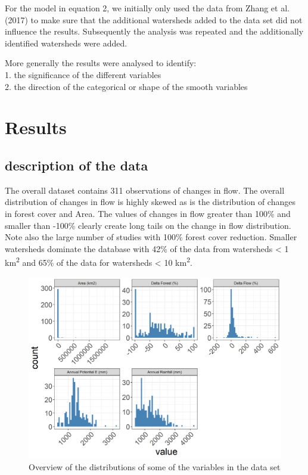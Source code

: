 \documentclass[]{elsarticle} %
\begin{document}
For the model in equation 2, we initially only used the data from Zhang
et al. (2017) to make sure that the additional watersheds added to the
data set did not influence the results. Subsequently the analysis was
repeated and the additionally identified watersheds were added.

More generally the results were analysed to identify:\\
1. the significance of the different variables\\
2. the direction of the categorical or shape of the smooth variables

\hypertarget{results}{%
\section{Results}\label{results}}

\hypertarget{description-of-the-data}{%
\subsection{description of the data}\label{description-of-the-data}}

The overall dataset contains 311 observations of changes in flow. The
overall distribution of changes in flow is highly skewed as is the
distribution of changes in forest cover and Area. The values of changes
in flow greater than 100\% and smaller than -100\% clearly create long
tails on the change in flow distribution. Note also the large number of
studies with 100\% forest cover reduction. Smaller watersheds dominate
the database with 42\% of the data from watersheds \textless{} 1
km\textsuperscript{2} and 65\% of the data for watersheds \textless{} 10
km\textsuperscript{2}.

\begin{figure}
\includegraphics[width=0.9\linewidth]{DataExploration} \caption{Overview of the distributions of some of the variables in the data set}\label{fig:data_graphs}
\end{figure}
\end{document}
